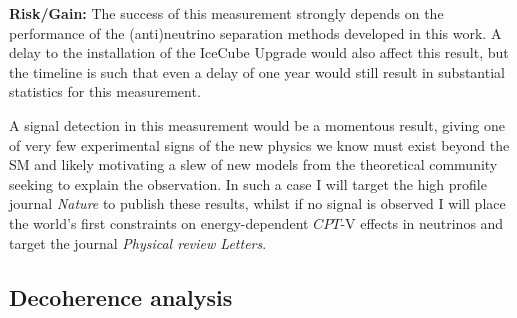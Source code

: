 \documentclass[a4paper,11pt]{article}
\begin{document}
\textbf{Risk/Gain:} The success of this measurement strongly depends on the performance of the (anti)neutrino separation methods developed in this work. A delay to the installation of the IceCube Upgrade would also affect this result, but the timeline is such that even a delay of one year would still result in substantial statistics for this measurement.

A signal detection in this measurement would be a momentous result, giving one of very few experimental signs of the new physics we know must exist beyond the SM and likely motivating a slew of new models from the theoretical community seeking to explain the observation. In such a case I will target the high profile journal \textit{Nature} to publish these results, whilst if no signal is observed I will place the world's first constraints on energy-dependent $CPT$-V effects in neutrinos and target the journal \textit{Physical review Letters}.\\

\subsection{Decoherence analysis}
\end{document}
